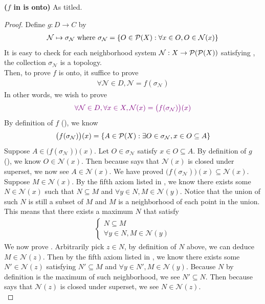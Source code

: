 \documentclass{report}
\begin{document}
\begin{theorem}
\label{1.1.3}
\textbf{($f$ in  is onto)} As titled. 
\end{theorem}
\begin{proof}
Define $g:D\rightarrow C$ by 
\begin{align}
\label{1.3}
\mathcal{N} \mapsto \sigma_\mathcal{N} \text{ where }\sigma_{\mathcal{N}}=\{ O \in \mathcal{P}(X): \forall  x\in O, O \in \mathcal{N}(x) \} 
\end{align}
It is easy to check for each neighborhood system $\mathcal{N}:X \rightarrow \mathcal{P}(\mathcal{P}(X))$ satisfying , the collection $\sigma_{\mathcal{N}}$ is a topology.\\

Then, to prove $f$ is onto, it suffice to prove 
\begin{align*}
\forall \mathcal{N} \in D, \mathcal{N}=f(\sigma_\mathcal{N})
\end{align*}
In other words, we wish to prove 
\begin{align*}
  \textcolor{violet}{\forall \mathcal{N} \in D, \forall x \in X, \mathcal{N}(x)=\big(f(\sigma_\mathcal{N}) \big)(x)}
\end{align*}
By definition of $f$ (), we know 
\begin{align}
\label{1.4}
\big(f(\sigma_\mathcal{N}) \big)(x)=\{ A \in \mathcal{P}(X):\exists O \in \sigma_\mathcal{N}, x \in O \subseteq A \}
\end{align}
Suppose $A \in \big(f(\sigma_\mathcal{N}) \big)(x)$. Let $O \in \sigma_\mathcal{N}$ satisfy $x \in O \subseteq A$. By definition of $g$ (), we know $O \in \mathcal{N}(x)$. Then because  says that $\mathcal{N}(x)$ is closed under superset, we now see $A \in \mathcal{N}(x)$. We have proved $\big(f(\sigma_\mathcal{N}) \big)(x)\subseteq \mathcal{N}(x)$.\\

Suppose $M \in \mathcal{N}(x)$. By the fifth axiom listed in , we know there exists some $N \in \mathcal{N}(x)$ such that $N \subseteq M$ and $\forall y \in N,M \in \mathcal{N}(y)$. Notice that the union of such $N$ is still a subset of  $M$ and  $M$ is a neighborhood of each point in the union. This means that there exists a maximum $N$ that satisfy 
\begin{align*}
\begin{cases}
  N \subseteq M\\
  \forall y \in N, M \in \mathcal{N}(y)
\end{cases}
\end{align*}
We now prove  . Arbitrarily pick $z \in N$, by definition of $N$ above, we can deduce $M \in \mathcal{N}(z)$. Then by the fifth axiom listed in , we know there exists some $N' \in \mathcal{N}(z)$ satisfying $N' \subseteq M$ and $\forall y \in N' ,M \in \mathcal{N}(y)$. Because $N$ by definition is the maximum of such neighborhood, we see $N'\subseteq N$. Then because  says that $\mathcal{N}(z)$ is closed under superset, we see $N \in \mathcal{N}(z)$.\\


\end{proof}
\end{document}
